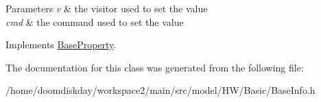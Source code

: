 \begin{DoxyParams}{Parameters}
{\em v} & the visitor used to set the value \\
\hline
{\em cmd} & the command used to set the value \\
\hline
\end{DoxyParams}


Implements \hyperlink{classBaseProperty_a83a5d6b8ebee03e73e11a7a57df56df3}{Base\+Property}.



The documentation for this class was generated from the following file\+:\begin{DoxyCompactItemize}
\item 
/home/doomdiskday/workspace2/main/src/model/\+H\+W/\+Basic/Base\+Info.\+h\end{DoxyCompactItemize}
